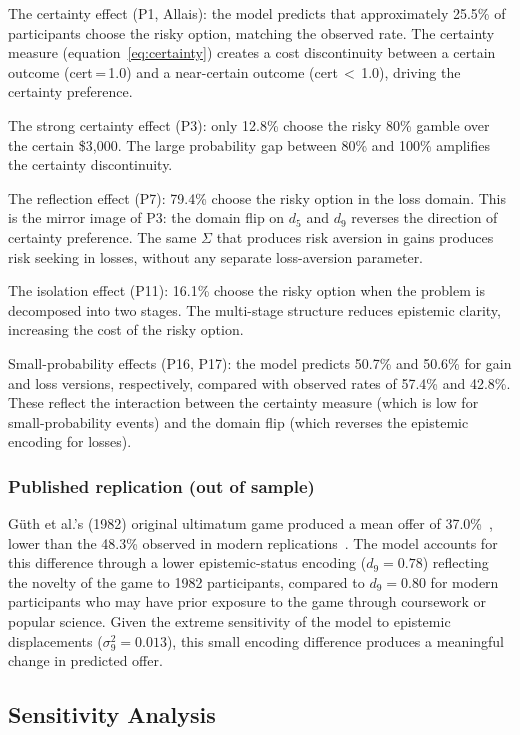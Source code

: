 \documentclass[journal]{IEEEtran}
\begin{document}
The certainty effect (P1, Allais): the model predicts that approximately 25.5\% of participants choose the risky option, matching the observed rate.
The certainty measure (equation~\eqref{eq:certainty}) creates a cost discontinuity between a certain outcome (cert\,=\,1.0) and a near-certain outcome (cert\,$<$\,1.0), driving the certainty preference.

The strong certainty effect (P3): only 12.8\% choose the risky 80\% gamble over the certain \$3,000.
The large probability gap between 80\% and 100\% amplifies the certainty discontinuity.

The reflection effect (P7): 79.4\% choose the risky option in the loss domain.
This is the mirror image of P3: the domain flip on $d_5$ and $d_9$ reverses the direction of certainty preference.
The same $\Sigma$ that produces risk aversion in gains produces risk seeking in losses, without any separate loss-aversion parameter.

The isolation effect (P11): 16.1\% choose the risky option when the problem is decomposed into two stages.
The multi-stage structure reduces epistemic clarity, increasing the cost of the risky option.

Small-probability effects (P16, P17): the model predicts 50.7\% and 50.6\% for gain and loss versions, respectively, compared with observed rates of 57.4\% and 42.8\%.
These reflect the interaction between the certainty measure (which is low for small-probability events) and the domain flip (which reverses the epistemic encoding for losses).

\subsubsection{Published replication (out of sample)}

G\"uth et al.'s (1982) original ultimatum game produced a mean offer of 37.0\%~\cite{guth1982}, lower than the 48.3\% observed in modern replications~\cite{fraser2020}.
The model accounts for this difference through a lower epistemic-status encoding ($d_9 = 0.78$) reflecting the novelty of the game to 1982 participants, compared to $d_9 = 0.80$ for modern participants who may have prior exposure to the game through coursework or popular science.
Given the extreme sensitivity of the model to epistemic displacements ($\sigma_9^2 = 0.013$), this small encoding difference produces a meaningful change in predicted offer.

\subsection{Sensitivity Analysis}
\end{document}
